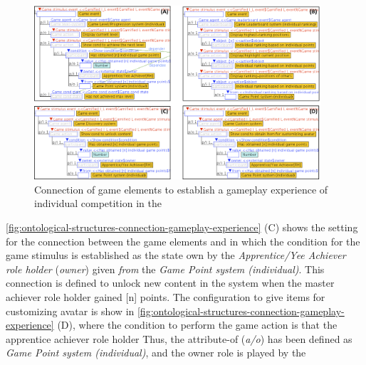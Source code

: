 \begin{figure}[!htbp]
 \caption[Connection of game elements to establish a gameplay experience of individual competition in the \emph{Gamified Cognitive Apprenticeship Scenario for Master/Yee Achiever and Apprentice/Yee Achiever}]{Connection of game elements to establish a gameplay experience of individual competition in the }
 \label{fig:ontological-structures-connection-gameplay-experience}
 \centering
 \includegraphics[width=0.95\textwidth]{images/chap-ontogacles2/ontological-structures-connection-gameplay-experience.png}
 \fautor
\end{figure}

\autoref{fig:ontological-structures-connection-gameplay-experience} (C) shows the setting for the connection between the game elements  and  in which the condition  for the game stimulus  is established as the state own by the \emph{Apprentice/Yee Achiever role holder} (\emph{owner}) given \emph{from} the \emph{Game Point system (individual)}. This connection is defined to unlock new content in the system when the master achiever role holder gained [n] points. The configuration to give items for customizing avatar is show in \autoref{fig:ontological-structures-connection-gameplay-experience} (D), where the condition to perform the game action  is that the apprentice achiever role holder  Thus, the attribute-of (\emph{a/o})  has been defined as \emph{Game Point system (individual)}, and the owner role is played by the 

